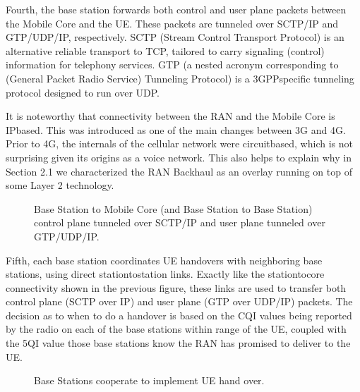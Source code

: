 \documentclass[a4paper,11pt,english]{sphinxmanual}
\let\sphinxpxdimen\pdfpxdimen\else\newdimen\sphinxpxdimen
\begin{document}
\sphinxAtStartPar
Fourth, the base station forwards both control and user plane packets
between the Mobile Core and the UE. These packets are tunneled over
SCTP/IP and GTP/UDP/IP, respectively. SCTP (Stream Control Transport
Protocol) is an alternative reliable transport to TCP, tailored to carry
signaling (control) information for telephony services. GTP (a nested
acronym corresponding to (General Packet Radio Service) Tunneling
Protocol) is a 3GPP\sphinxhyphen{}specific tunneling protocol designed to run over
UDP.

\sphinxAtStartPar
It is noteworthy that connectivity between the RAN and the Mobile Core
is IP\sphinxhyphen{}based. This was introduced as one of the main changes between 3G
and 4G. Prior to 4G, the internals of the cellular network were
circuit\sphinxhyphen{}based, which is not surprising given its origins as a voice
network. This also helps to explain why in Section 2.1 we
characterized the RAN Backhaul as an overlay running on top of some
Layer 2 technology.

\begin{figure}[ht]
\centering
\capstart

\noindent\sphinxincludegraphics[width=500\sphinxpxdimen]{{Slide9}.png}
\caption{Base Station to Mobile Core (and Base Station to Base
Station) control plane tunneled over SCTP/IP and user plane
tunneled over GTP/UDP/IP.}\label{\detokenize{arch:id10}}\label{\detokenize{arch:fig-tunnels}}\end{figure}

\sphinxAtStartPar
Fifth, each base station coordinates UE handovers with neighboring
base stations, using direct station\sphinxhyphen{}to\sphinxhyphen{}station links. Exactly like the
station\sphinxhyphen{}to\sphinxhyphen{}core connectivity shown in the previous figure, these links
are used to transfer both control plane (SCTP over IP) and user plane
(GTP over UDP/IP) packets. The decision as to when to do a handover is
based on the CQI values being reported by the radio on each of the
base stations within range of the UE, coupled with the 5QI value those
base stations know the RAN has promised to deliver to the UE.

\begin{figure}[ht]
\centering
\capstart

\noindent\sphinxincludegraphics[width=500\sphinxpxdimen]{{Slide10}.png}
\caption{Base Stations cooperate to implement UE hand over.}\label{\detokenize{arch:id11}}\label{\detokenize{arch:fig-handover}}\end{figure}
\end{document}

